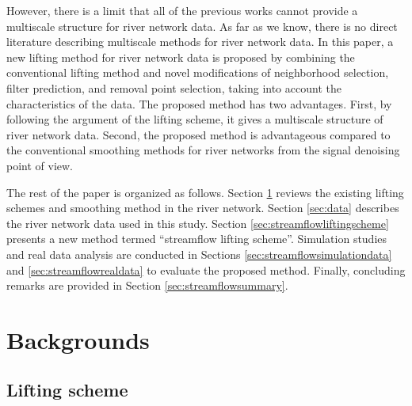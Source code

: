 \documentclass[11pt,titlepage]{article}
\begin{document}
However, there is a limit that all of the previous works cannot provide a multiscale structure for river network data. As far as we know, there is no direct literature describing multiscale methods for river network data. In this paper, a new lifting method for river network data is proposed by combining the conventional lifting method and novel modifications of neighborhood selection, filter prediction, and removal point selection, taking into account the characteristics of the data. The proposed method has two advantages. First, by following the argument of the lifting scheme, it gives a multiscale structure of river network data. Second, the proposed method is advantageous compared to the conventional smoothing methods for river networks from the signal denoising point of view.

The rest of the paper is organized as follows. Section \ref{sec:lifting} reviews the existing lifting schemes and smoothing method in the river network. Section \ref{sec:data} describes the river network data used in this study. Section \ref{sec:streamflowliftingscheme} presents a new method termed ``streamflow lifting scheme''. Simulation studies and real data analysis are conducted in Sections \ref{sec:streamflowsimulationdata} and \ref{sec:streamflowrealdata} to evaluate the proposed method. Finally, concluding remarks are provided in Section \ref{sec:streamflowsummary}.

\section{Backgrounds}\label{sec:lifting}

\subsection{Lifting scheme}
\end{document}
